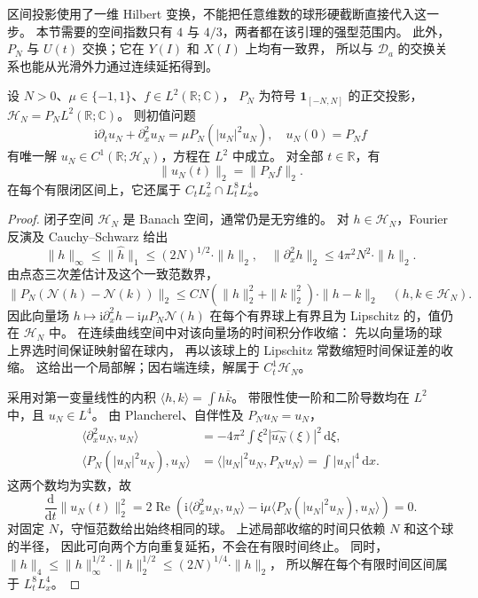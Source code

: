 区间投影使用了一维 Hilbert 变换，不能把任意维数的球形硬截断直接代入这一步。
本节需要的空间指数只有 \(4\) 与 \(4/3\)，两者都在该引理的强型范围内。
此外，\(P_N\) 与 \(U(t)\) 交换；它在 \(Y(I)\) 和 \(X(I)\) 上均有一致界，
所以与 \(\mathcal D_a\) 的交换关系也能从光滑外力通过连续延拓得到。

\begin{proposition}[带限近似的全局解与质量]\label{b2:prop:E-truncated-mass}
设 \(N>0\)、\(\mu\in\{-1,1\}\)、\(f\in L^2(\mathbb R;\mathbb C)\)，
\(P_N\) 为符号 \(\mathbf1_{[-N,N]}\) 的正交投影，
\(\mathcal H_N=P_NL^2(\mathbb R;\mathbb C)\)。
则初值问题
\[
 \mathrm i\partial_tu_N+\partial_x^2u_N
      =\mu P_N(|u_N|^2u_N),
 \quad u_N(0)=P_Nf
\]
有唯一解 \(u_N\in C^1(\mathbb R;\mathcal H_N)\)，方程在 \(L^2\) 中成立。
对全部 \(t\in\mathbb R\)，有
\[
 \|u_N(t)\|_2=\|P_Nf\|_2.
\]
在每个有限闭区间上，它还属于 \(C_tL^2_x\cap L^8_tL^4_x\)。
\end{proposition}
\begin{proof}
闭子空间 \(\mathcal H_N\) 是 Banach 空间，通常仍是无穷维的。
对 \(h\in\mathcal H_N\)，Fourier 反演及 Cauchy--Schwarz 给出
\[
 \|h\|_\infty\le\|\widehat h\|_1
       \le(2N)^{1/2}\cdot\|h\|_2,
 \quad \|\partial_x^2h\|_2\le4\pi^2N^2\cdot\|h\|_2.
\]
由点态三次差估计及这个一致范数界，
\[
 \|P_N(\mathcal N(h)-\mathcal N(k))\|_2
 \le C N\left(\|h\|_2^2+\|k\|_2^2\right)\cdot\|h-k\|_2
 \quad(h,k\in\mathcal H_N).
\]
因此向量场
\(h\mapsto\mathrm i\partial_x^2h-\mathrm i\mu P_N\mathcal N(h)\)
在每个有界球上有界且为 Lipschitz 的，值仍在 \(\mathcal H_N\) 中。
在连续曲线空间中对该向量场的时间积分作收缩：
先以向量场的球上界选时间保证映射留在球内，
再以该球上的 Lipschitz 常数缩短时间保证差的收缩。
这给出一个局部解；因右端连续，解属于 \(C^1_t\mathcal H_N\)。

采用对第一变量线性的内积 \(\langle h,k\rangle=\int h\overline k\)。
带限性使一阶和二阶导数均在 \(L^2\) 中，且 \(u_N\in L^4\)。
由 Plancherel、自伴性及 \(P_Nu_N=u_N\)，
\[
 \begin{aligned}
 \langle\partial_x^2u_N,u_N\rangle
 &=-4\pi^2\int\xi^2|\widehat{u_N}(\xi)|^2\,\mathrm d\xi,\\
 \langle P_N(|u_N|^2u_N),u_N\rangle
 &=\langle|u_N|^2u_N,P_Nu_N\rangle
   =\int|u_N|^4\,\mathrm dx.
 \end{aligned}
\]
这两个数均为实数，故
\[
 \frac{\mathrm d}{\mathrm dt}\|u_N(t)\|_2^2
 =2\operatorname{Re}
   \left(\mathrm i\langle\partial_x^2u_N,u_N\rangle
       -\mathrm i\mu\langle P_N(|u_N|^2u_N),u_N\rangle\right)=0.
\]
对固定 \(N\)，守恒范数给出始终相同的球。
上述局部收缩的时间只依赖 \(N\) 和这个球的半径，
因此可向两个方向重复延拓，不会在有限时间终止。
同时，\(\|h\|_4\le\|h\|_\infty^{1/2}\cdot\|h\|_2^{1/2}
\le(2N)^{1/4}\cdot\|h\|_2\)，
所以解在每个有限时间区间属于 \(L^8_tL^4_x\)。
\end{proof}

